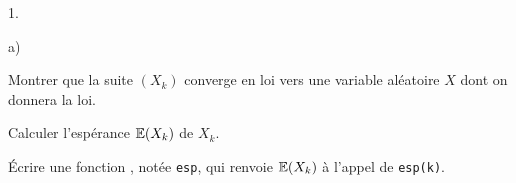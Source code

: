 \documentclass[11pt]{article}%
\begin{document}
\begin{noliste}{1.}
\begin{noliste}{a)}
\item Montrer que la suite $(X_{k})$ converge en loi vers une variable
aléatoire $X$ dont on donnera la loi.

\item 
Calculer l'espérance $\mathbb{E}(X_{k})$ de $X_{k}$.

\item Écrire une fonction \Scilab{}, notée \texttt{esp}, qui renvoie
$\mathbb{E}(X_{k})$ 
à l'appel de \texttt{esp(k)}.
\end{noliste}
\end{noliste}
\end{document}
